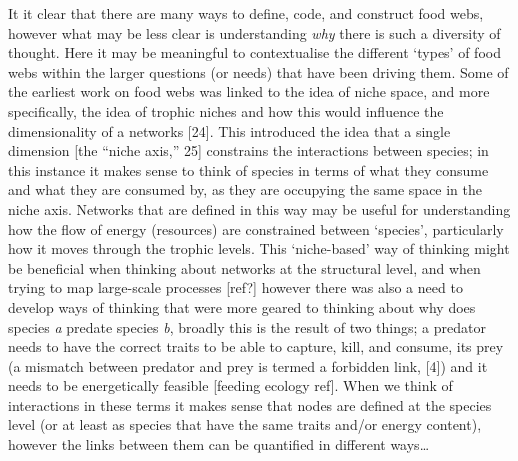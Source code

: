 \documentclass[
]{article}
\begin{document}
It it clear that there are many ways to define, code, and construct food
webs, however what may be less clear is understanding \emph{why} there
is such a diversity of thought. Here it may be meaningful to
contextualise the different `types' of food webs within the larger
questions (or needs) that have been driving them. Some of the earliest
work on food webs was linked to the idea of niche space, and more
specifically, the idea of trophic niches and how this would influence
the dimensionality of a networks {[}24{]}. This introduced the idea that
a single dimension {[}the ``niche axis,'' 25{]} constrains the
interactions between species; in this instance it makes sense to think
of species in terms of what they consume and what they are consumed by,
as they are occupying the same space in the niche axis. Networks that
are defined in this way may be useful for understanding how the flow of
energy (resources) are constrained between `species', particularly how
it moves through the trophic levels. This `niche-based' way of thinking
might be beneficial when thinking about networks at the structural
level, and when trying to map large-scale processes {[}ref?{]} however
there was also a need to develop ways of thinking that were more geared
to thinking about why does species \emph{a} predate species \emph{b},
broadly this is the result of two things; a predator needs to have the
correct traits to be able to capture, kill, and consume, its prey (a
mismatch between predator and prey is termed a forbidden link, {[}4{]})
and it needs to be energetically feasible {[}feeding ecology ref{]}.
When we think of interactions in these terms it makes sense that nodes
are defined at the species level (or at least as species that have the
same traits and/or energy content), however the links between them can
be quantified in different ways\ldots{}
\end{document}
